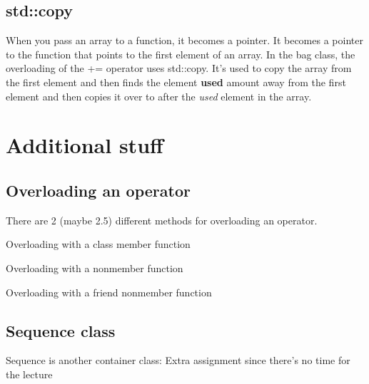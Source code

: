 \documentclass[11pt,a4paper,english]{paper}
\begin{document}
\subsection{std::copy}

When you pass an array to a function, it becomes a pointer. It becomes a pointer to the function that points to the first element of an array. In the bag class, the overloading of the += operator uses std::copy. It's used to copy the array from the first element and then finds the element \textbf{used} amount away from the first element and then copies it over to after the \textit{used} element in the array. 


\section{Additional stuff}

\subsection{Overloading an operator}

There are 2 (maybe 2.5) different methods for overloading an operator.

\begin{itemize} {
  
    \item Overloading with a class member function
    \item Overloading with a nonmember function
    \item Overloading with a friend nonmember function
  
  }
\end{itemize}

\subsection{Sequence class}

Sequence is another container class: Extra assignment since there's no time for the lecture
\end{document}
